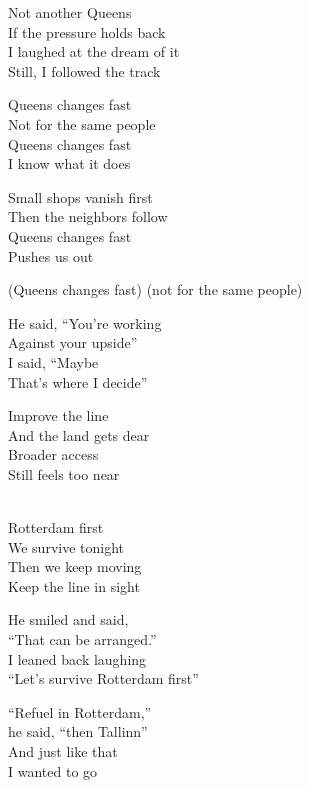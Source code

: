 \begin{lyrics}
Not another Queens\\
If the pressure holds back\\
I laughed at the dream of it\\
Still, I followed the track

Queens changes fast\\
Not for the same people\\
Queens changes fast\\
I know what it does

Small shops vanish first\\
Then the neighbors follow\\
Queens changes fast\\
Pushes us out

(Queens changes fast)
(not for the same people)

He said, “You’re working\\
Against your upside”\\
I said, “Maybe\\
That’s where I decide”

Improve the line\\
And the land gets dear\\
Broader access\\
Still feels too near

\\
Rotterdam first\\
We survive tonight\\
Then we keep moving\\
Keep the line in sight

He smiled and said,\\
“That can be arranged.”\\
I leaned back laughing\\
“Let’s survive Rotterdam first”

“Refuel in Rotterdam,”\\
he said, “then Tallinn”\\
And just like that\\
I wanted to go
\end{lyrics}

